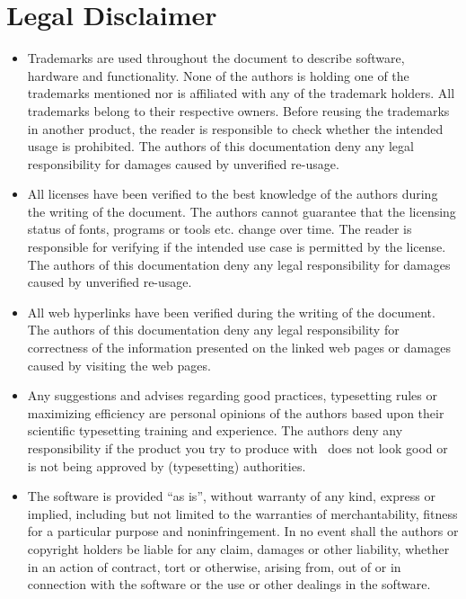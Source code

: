 \chapter{Legal Disclaimer}
	\begin{itemize}
		\item Trademarks are used throughout the document to describe software, hardware and \mbox{functionality}. None of the authors is holding one of the trademarks mentioned nor is affiliated with any of the trademark holders. All trademarks belong to their respective owners. Before reusing the trademarks in another product, the reader is responsible to check whether the intended usage is prohibited. The authors of this documentation deny any legal responsibility for damages caused by unverified re-usage.
		\item  All licenses have been verified to the best knowledge of the authors during the writing of the document. The authors cannot guarantee that the licensing status of fonts, programs or tools etc. change over time. The reader is responsible for verifying if the intended use case is permitted by the license. The authors of this documentation deny any legal responsibility for damages caused by unverified re-usage.
		\item All web hyperlinks have been verified during the writing of the document. The authors of this documentation deny any legal responsibility for correctness of the information presented on the linked web pages or damages caused by visiting the web pages.
		\item Any suggestions and advises regarding good practices, typesetting rules or maximizing efficiency are personal opinions of the authors based upon their scientific typesetting training and experience. The authors deny any responsibility if the product you try to produce with \productName~does not look good or is not being approved by (typesetting) authorities.
		\item The software is provided \enquote{as is}, without warranty of any kind, express or implied, including but not limited to the warranties of merchantability, fitness for a particular purpose and noninfringement. In no event shall the authors or copyright holders be liable for any claim, damages or other liability, whether in an action of contract, tort or otherwise, arising from, out of or in connection with the software or the use or other dealings in the software.
	\end{itemize}


\newpage	
